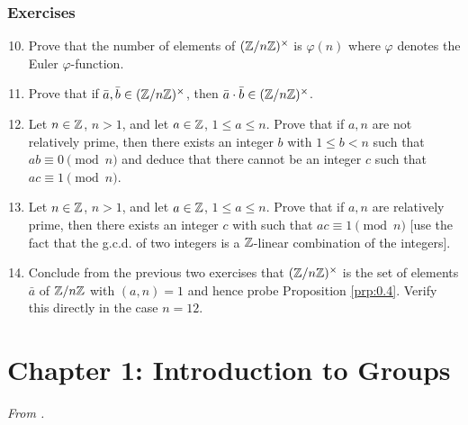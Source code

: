 \documentclass[../notes.tex]{subfiles}
\begin{document}
\subsubsection*{Exercises}
\begin{enumerate}[label={\textbf{\arabic*.}},ref={0.3.\arabic*}]
    \setcounter{enumi}{9}
    \item \label{exr:0.3.10}Prove that the number of elements of $(\mathbb{Z}/n\mathbb{Z})^\times$ is $\varphi(n)$ where $\varphi$ denotes the Euler $\varphi$-function.
    \item \label{exr:0.3.11}Prove that if $\bar{a},\bar{b}\in(\mathbb{Z}/n\mathbb{Z})^\times$, then $\bar{a}\cdot\bar{b}\in(\mathbb{Z}/n\mathbb{Z})^\times$.
    \item \label{exr:0.3.12}Let $n\in\mathbb{Z}$, $n>1$, and let $a\in\mathbb{Z}$, $1\leq a\leq n$. Prove that if $a,n$ are not relatively prime, then there exists an integer $b$ with $1\leq b<n$ such that $ab\equiv 0\pmod n$ and deduce that there cannot be an integer $c$ such that $ac\equiv 1\pmod n$.
    \item \label{exr:0.3.13}Let $n\in\mathbb{Z}$, $n>1$, and let $a\in\mathbb{Z}$, $1\leq a\leq n$. Prove that if $a,n$ are relatively prime, then there exists an integer $c$ with such that $ac\equiv 1\pmod n$ [use the fact that the g.c.d. of two integers is a $\mathbb{Z}$-linear combination of the integers].
    \item \label{exr:0.3.14}Conclude from the previous two exercises that $(\mathbb{Z}/n\mathbb{Z})^\times$ is the set of elements $\bar{a}$ of $\mathbb{Z}/n\mathbb{Z}$ with $(a,n)=1$ and hence probe Proposition \ref{prp:0.4}. Verify this directly in the case $n=12$.
\end{enumerate}



\section{Chapter 1: Introduction to Groups}
\emph{From \textcite{bib:DummitFoote}.}
\end{document}
